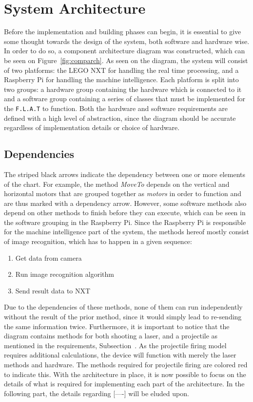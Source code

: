 \section{System Architecture}
\label{sec:architecture}
Before the implementation and building phases can begin, it is essential to give some thought towards the design of the system, both software and hardware wise.
In order to do so, a component architecture diagram was constructed, which can be seen on Figure~\ref{fig:comparch}.
As seen on the diagram, the system will consist of two platforms: the LEGO NXT for handling the real time processing, and a Raspberry Pi for handling the machine intelligence.
Each platform is split into two groups: a hardware group containing the hardware which is connected to it and a software group containing a series of classes that must be implemented for the \texttt{F.L.A.T} to function.
Both the hardware and software requirements are defined with a high level of abstraction, since the diagram should be accurate regardless of implementation details or choice of hardware.
 
\subsection*{Dependencies}
The striped black arrows indicate the dependency between one or more elements of the chart. 
For example, the method \textit{MoveTo} depends on the vertical and horizontal motors that are grouped together as \textit{motors} in order to function and are thus marked with a dependency arrow.
However, some software methods also depend on other methods to finish before they can execute, which can be seen in the software grouping in the Raspberry Pi.
Since the Raspberry Pi is responsible for the machine intelligence part of the system, the methods hereof mostly consist of image recognition, which has to happen in a given sequence:
\begin{enumerate}
\item Get data from camera
\item Run image recognition algorithm
\item Send result data to NXT
\end{enumerate}

Due to the dependencies of these methods, none of them can run independently without the result of the prior method, since it would simply lead to re-sending the same information twice.
Furthermore, it is important to notice that the diagram contains methods for both shooting a laser, and a projectile as mentioned in the requirements, Subsection~\label{subsec:requirements}.
As the projectile firing model requires additional calculations, the device will function with merely the laser methods and hardware. 
The methods required for projectile firing are colored red to indicate this.
With the architecture in place, it is now possible to focus on the details of what is required for implementing each part of the architecture.
In the following part, the details regarding [----] will be eluded upon.

